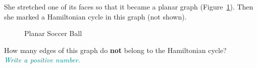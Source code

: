 \documentclass[jou]{apa6}
\begin{document}
She stretched one of its faces so that it became a planar graph
(Figure~\ref{fig:icosahedron2d}).
Then she marked a Hamiltonian cycle in this graph (not shown).


\begin{figure}[!htb]
\caption{\label{fig:icosahedron2d} Planar Soccer Ball}
\end{figure}

How many edges of this graph do {\bf not} belong to the Hamiltonian cycle?\\
\textcolor{teal}{\em Write a positive number.}
\end{document}
